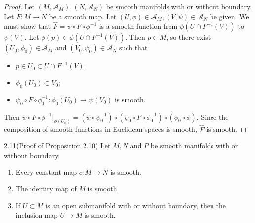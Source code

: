 \begin{proof}
  Let $(M, \mathcal{A}_M), (N, \mathcal{A}_N)$ be smooth manifolds with or without boundary.
  Let $F: M \rightarrow N$ be a smooth map.
  Let $(U, \phi) \in \mathcal{A}_M, (V, \psi) \in \mathcal{A}_N$ be given.
  We must show that $\hat{F} = \psi \circ F \circ \phi^{-1}$ is a smooth function from $\phi(U \cap F^{-1}(V))$ to $\psi(V)$.
  Let $\phi(p) \in \phi(U \cap F^{-1}(V))$.
  Then $p \in M$, so there exist $(U_0, \phi_0) \in \mathcal{A}_M$ and $(V_0, \psi_0) \in \mathcal{A}_N$ such that
  \begin{itemize}
    \item
      $p \in U_0 \subset U \cap F^{-1}(V)$;
    \item
      $\phi_0(U_0) \subset V_0$;
    \item
      $\psi_0 \circ F \circ \phi_0^{-1}:\phi_0(U_0) \rightarrow \psi(V_0)$ is smooth.
  \end{itemize}
  Then $\psi \circ F \circ \phi^{-1} \vert_{\phi(U_0)} = (\psi \circ \psi_0^{-1}) \circ (\psi_0 \circ F \circ \phi_0^{-1}) \circ (\phi_0 \circ \phi)$.
  Since the composition of smooth functions in Euclidean spaces is smooth, $\hat{F}$ is smooth.
\end{proof}

\begin{customexer}{2.11(Proof of Proposition 2.10)}\label{exercise_2_11}
  Let $M, N$ and $P$ be smooth manifolds with or without boundary.
  \begin{enumerate}[label=(\alph*)]
    \item 
      Every constant map $c: M \rightarrow N$ is smooth.
    \item
      The identity map of $M$ is smooth.
    \item
      If $U \subset M$ is an open submanifold with or without boundary, then the inclusion map $U \rightarrow M$ is smooth.
  \end{enumerate}
\end{customexer}

